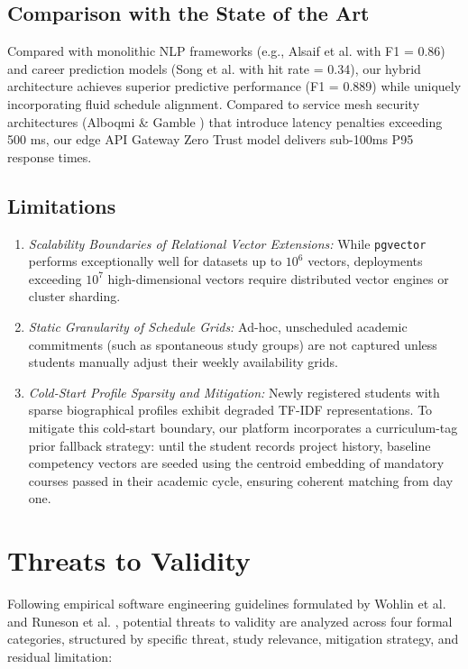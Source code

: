 \documentclass[a4paper,fleqn]{cas-dc}
\begin{document}
\subsection{Comparison with the State of the Art}
Compared with monolithic NLP frameworks (e.g., Alsaif et al. \cite{alsaif2022} with F1 = 0.86) and career prediction models (Song et al. \cite{song2022} with hit rate = 0.34), our hybrid architecture achieves superior predictive performance (F1 = 0.889) while uniquely incorporating fluid schedule alignment. Compared to service mesh security architectures (Alboqmi \& Gamble \cite{alboqmi2025}) that introduce latency penalties exceeding 500 ms, our edge API Gateway Zero Trust model delivers sub-100ms P95 response times.

\subsection{Limitations}
\begin{enumerate}
    \item \textit{Scalability Boundaries of Relational Vector Extensions:} While \texttt{pgvector} performs exceptionally well for datasets up to $10^6$ vectors, deployments exceeding $10^7$ high-dimensional vectors require distributed vector engines or cluster sharding.
    \item \textit{Static Granularity of Schedule Grids:} Ad-hoc, unscheduled academic commitments (such as spontaneous study groups) are not captured unless students manually adjust their weekly availability grids.
    \item \textit{Cold-Start Profile Sparsity and Mitigation:} Newly registered students with sparse biographical profiles exhibit degraded TF-IDF representations. To mitigate this cold-start boundary, our platform incorporates a curriculum-tag prior fallback strategy: until the student records project history, baseline competency vectors are seeded using the centroid embedding of mandatory courses passed in their academic cycle, ensuring coherent matching from day one.
\end{enumerate}

\section{Threats to Validity}
\label{sec:threats}
Following empirical software engineering guidelines formulated by Wohlin et al. \cite{wohlin2012} and Runeson et al. \cite{runeson2012}, potential threats to validity are analyzed across four formal categories, structured by specific threat, study relevance, mitigation strategy, and residual limitation:
\end{document}
